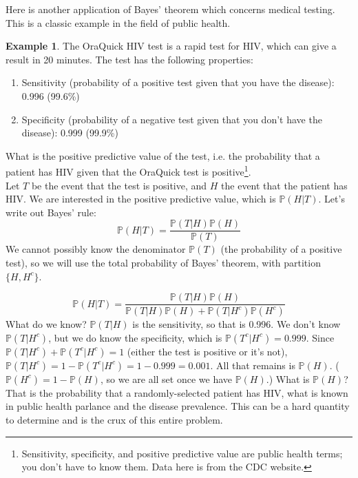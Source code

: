 \documentclass[12pt]{article}
\theoremstyle{definition}
\newtheorem*{example}{Example}
\theoremstyle{remark}
\def\P{{\mathbb P}}
\begin{document}
Here is another application of Bayes' theorem which concerns medical testing. This is a classic example in the field of public health.

\begin{example}
The OraQuick HIV test is a rapid test for HIV, which can give a result in 20 minutes. The test has the following properties:
\begin{enumerate}
\item Sensitivity (probability of a positive test given that you have the disease): 0.996 (99.6\%)
\item Specificity (probability of a negative test given that you don't have the disease): 0.999 (99.9\%)
\end{enumerate}
What is the positive predictive value of the test, i.e. the probability that a patient has HIV given that the OraQuick test is positive\footnote{Sensitivity, specificity, and positive predictive value are public health terms; you don't have to know them. Data here is from the CDC website.}.\\

Let $T$ be the event that the test is positive, and $H$ the event that the patient has HIV. We are interested in the positive predictive value, which is $\P(H|T)$. Let's write out Bayes' rule:
\[
\P(H|T) = \frac{ \P(T|H)\P(H)}{ \P(T) }
\]
We cannot possibly know the denominator $\P(T)$ (the probability of a positive test), so we will use the total probability of Bayes' theorem, with partition $\{H, H^c\}$.

\[
\P(H|T) = \frac{ \P(T|H)\P(H)}{ \P(T|H)\P(H) + \P(T|H^c)\P(H^c) }
\]
What do we know? $\P(T|H)$ is the sensitivity, so that is 0.996. We don't know $\P(T|H^c)$, but we do know the specificity, which is $\P(T^c|H^c) = 0.999$. Since $\P(T|H^c) + \P(T^c|H^c) = 1$ (either the test is positive or it's not), $\P(T|H^c) = 1 - \P(T^c|H^c) = 1 - 0.999 = 0.001$. All that remains is $\P(H)$. ($\P(H^c) = 1 - \P(H)$, so we are all set once we have $\P(H)$.) What is $\P(H)$? That is the probability that a randomly-selected patient has HIV, what is known in public health parlance and the disease prevalence. This can be a hard quantity to determine and is the crux of this entire problem.\\


\end{example}
\end{document}
